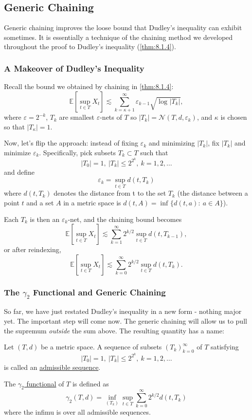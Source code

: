 \subsection{Generic Chaining}
Generic chaining improves the loose bound that Dudley's inequality can exhibit sometimes. It is essentially a 
technique of the chaining method we developed throughout the proof to Dudley's inequality (\cref{thm:8.1.4}).


\subsubsection{A Makeover of Dudley's Inequality}
Recall the bound we obtained by chaining in \cref{thm:8.1.4}:
\[ \mathbb{E}\left[ \sup_{t \in T}X_t \right] \lesssim \sum_{k = \kappa + 1}^{\infty} \varepsilon_{k - 1} 
\sqrt{\log_{}{|T_k|}}, \]
where $\varepsilon = 2^{-k}$, $T_k$ are smallest $\varepsilon$-nets of $T$ so $|T_k| = \mathcal{N}(T, d, 
\varepsilon_k)$, and $\kappa$ is chosen so that $|T_{\kappa}| = 1$.

Now, let's flip the approach: instead of fixing $\varepsilon_k$ and minimizing $|T_k|$, fix $|T_k|$ and 
minimize $\varepsilon_k$. Specifically, pick subsets $T_k \subset T$ such that 
\[ |T_0| = 1, \ |T_k| \leq 2^{2^k}, \ k = 1, 2, \dots \]
and define 
\[ \varepsilon_k = \sup_{t \in T} d(t, T_k) \]
where $d(t, T_k)$ denotes the distance from t to the set $T_k$ (the distance between a point $t$ and a set $A$ 
in a metric space is $d(t, A) = \inf_{} \{ d(t, a): \ a \in A \}$).

Each $T_k$ is then an $\varepsilon_k$-net, and the chaining bound becomes 
\[ \mathbb{E}\left[ \sup_{t \in T}X_t \right] \lesssim \sum_{k = 1}^{\infty} 2^{k/2} \sup_{t \in T} 
d(t, T_{k - 1}), \]
or after reindexing, 
\[ \mathbb{E}\left[ \sup_{t \in T}X_t \right] \lesssim \sum_{k = 0}^{\infty} 2^{k/2} \sup_{t \in T} d(t, T_k). \]


\subsubsection{The \texorpdfstring{$\gamma_2$}{} Functional and Generic Chaining}
So far, we have just restated Dudley's inequality in a new form - nothing major yet. The important step will 
come now. The generic chaining will allow us to pull the supremum \textit{outside} the sum above. The resulting 
quantity has a name:

\begin{definition}[]
\label{def:8.5.1}
Let $(T, d)$ be a metric space. A sequence of subsets $(T_k)_{k = 0}^{\infty}$ of $T$ satisfying 
\[ |T_0| = 1, \ |T_k| \leq 2^{2^k}, \ k = 1, 2, \dots \]
is called an \underline{admissible sequence}.

The \underline{$\gamma_2$ functional} of $T$ is defined as 
\[ \gamma_2(T, d) = \inf_{(T_k)} \sup_{t \in T} \sum_{k = 0}^{\infty} 2^{k / 2} d(t, T_k) \]
where the infimu is over all admissible sequences.
\end{definition}

